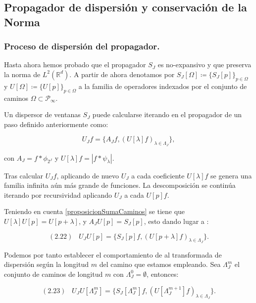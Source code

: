\subsection{Propagador de dispersión y conservación de la Norma} \label{ch:seccion13}


\subsubsection{Proceso de dispersión del propagador.}

\noindent Hasta ahora hemos probado que el propagador $S_J$ es no-expansivo y que preserva la norma de $L^2(\mathbb{R}^d)$. A partir de ahora denotamos por $S_J[\Omega] \coloneqq \lbrace S_J[p] \rbrace_{p\in\Omega}$ y $U[\Omega]\coloneqq \lbrace U[p] \rbrace_{p\in\Omega}$ a la familia de operadores indexados por el conjunto de caminos $\Omega \subset \mathcal{P}_\infty$.

\medskip

\noindent Un dispersor de ventanas $S_J$ puede calcularse iterando en el propagador de un paso definido anteriormente como: 

$$U_Jf=\lbrace A_Jf, (U[\lambda]f)_{\lambda\in\Lambda_J} \rbrace,$$

\noindent con $A_J=f\ast \phi_{2^J}$ y $U[\lambda]f=\left| f\ast \psi_\lambda \right|$. 

\medskip

\noindent Tras calcular $U_Jf$, aplicando de nuevo $U_J$ a cada coeficiente $U[\lambda]f$ se genera una familia infinita aún más grande de funciones. La descomposición se continúa iterando  por recursividad aplicando $U_J$ a cada $U[p]f$. 

\medskip

\noindent Teniendo en cuenta \autoref{proposicionSumaCaminos} se tiene que  $U[\lambda]U[p]=U[p+\lambda]$, y $A_JU[p]=S_J[p]$, esto dando lugar a : 

$$(2.22) \;\;\; U_JU[p]=\lbrace S_J[p]f,(U[p+\lambda]f)_{\lambda\in\Lambda_J}\rbrace.$$

\medskip

\noindent Podemos por tanto establecer el comportamiento de al transformada de dispersión según la longitud $m$ del camino que estamos empleando. Sea $\Lambda_J^m$ el conjunto de caminos de longitud $m$ con $\Lambda_J^0={\emptyset}$, entonces:

$$(2.23) \;\;\; U_J U[\Lambda_J^m]=\lbrace S_J[\Lambda_J^m]f,(U[\Lambda_J^{m+1}]f)_{\lambda\in\Lambda_J}\rbrace.$$

